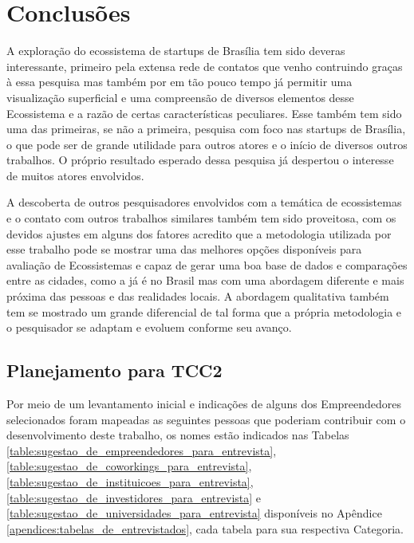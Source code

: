 \chapter[Conclusões Pré-Eliminares]{Conclusões}
\label{cap-conclusoes}

A exploração do ecossistema de startups de Brasília tem sido deveras interessante, primeiro pela extensa rede de contatos que venho contruindo graças à essa pesquisa mas também por em tão pouco tempo já permitir uma visualização superficial e uma compreensão de diversos elementos desse Ecossistema e a razão de certas características peculiares. Esse também tem sido uma das primeiras, se não a primeira, pesquisa com foco nas startups de Brasília, o que pode ser de grande utilidade para outros atores e o início de diversos outros trabalhos. O próprio resultado esperado dessa pesquisa já despertou o interesse de muitos atores envolvidos.

A descoberta de outros pesquisadores envolvidos com a temática de ecossistemas e o contato com outros trabalhos similares também tem sido proveitosa, com os devidos ajustes em alguns dos fatores acredito que a metodologia utilizada por esse trabalho pode se mostrar uma das melhores opções disponíveis para avaliação de Ecossistemas e capaz de gerar uma boa base de dados e comparações entre as cidades, como a  já é no Brasil mas com uma abordagem diferente e mais próxima das pessoas e das realidades locais. A abordagem qualitativa também tem se mostrado um grande diferencial de tal forma que a própria metodologia e o pesquisador se adaptam e evoluem conforme seu avanço.

\section{Planejamento para TCC2}
\label{section:cronograma_tcc2}

Por meio de um levantamento inicial e indicações de alguns dos Empreendedores selecionados foram mapeadas as seguintes pessoas que poderiam contribuir com o desenvolvimento deste trabalho, os nomes estão indicados nas Tabelas \ref{table:sugestao_de_empreendedores_para_entrevista}, \ref{table:sugestao_de_coworkings_para_entrevista}, \ref{table:sugestao_de_instituicoes_para_entrevista}, \ref{table:sugestao_de_investidores_para_entrevista} e \ref{table:sugestao_de_universidades_para_entrevista} disponíveis no Apêndice \ref{apendices:tabelas_de_entrevistados}, cada tabela para sua respectiva Categoria. 

